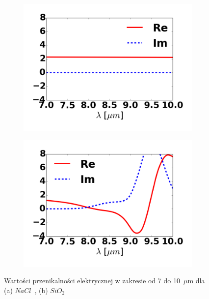 \begin{figure}[tb]
	\begin{subfigure}{0.45\textwidth}
		\includegraphics[width=\textwidth]{images/pml/nacl.png}
		\caption{}
	\end{subfigure}
	\begin{subfigure}{0.45\textwidth}
		\includegraphics[width=\textwidth]{images/pml/sio2.png}	
		\caption{}
	\end{subfigure}
	\caption{Wartości przenikalności elektrycznej w zakresie od 7 do 10~$\mu$m dla (a) $NaCl$~\cite{li1976refractive}, (b) $SiO_2$~\cite{Kischkat:12}}
	\label{fig:nacl-sio2-mat}
\end{figure}


